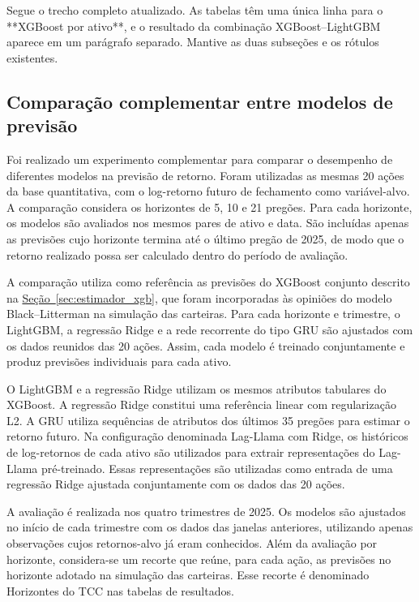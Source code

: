 Segue o trecho completo atualizado. As tabelas têm uma única linha para o **XGBoost por ativo**, e o resultado da combinação XGBoost–LightGBM aparece em um parágrafo separado. Mantive as duas subseções e os rótulos existentes.

\subsection{Comparação complementar entre modelos de previsão}
\label{sec:comparacao_modelos_previsao}

Foi realizado um experimento complementar para comparar o desempenho de diferentes modelos na previsão de retorno. Foram utilizadas as mesmas 20 ações da base quantitativa, com o log-retorno futuro de fechamento como variável-alvo. A comparação considera os horizontes de 5, 10 e 21 pregões. Para cada horizonte, os modelos são avaliados nos mesmos pares de ativo e data. São incluídas apenas as previsões cujo horizonte termina até o último pregão de 2025, de modo que o retorno realizado possa ser calculado dentro do período de avaliação.

A comparação utiliza como referência as previsões do XGBoost conjunto descrito na \hyperref[sec:estimador_xgb]{Seção~\ref*{sec:estimador_xgb}}, que foram incorporadas às opiniões do modelo Black--Litterman na simulação das carteiras. Para cada horizonte e trimestre, o LightGBM, a regressão Ridge e a rede recorrente do tipo GRU são ajustados com os dados reunidos das 20 ações. Assim, cada modelo é treinado conjuntamente e produz previsões individuais para cada ativo.

O LightGBM e a regressão Ridge utilizam os mesmos atributos tabulares do XGBoost. A regressão Ridge constitui uma referência linear com regularização L2. A GRU utiliza sequências de atributos dos últimos 35 pregões para estimar o retorno futuro. Na configuração denominada Lag-Llama com Ridge, os históricos de log-retornos de cada ativo são utilizados para extrair representações do Lag-Llama pré-treinado. Essas representações são utilizadas como entrada de uma regressão Ridge ajustada conjuntamente com os dados das 20 ações.

A avaliação é realizada nos quatro trimestres de 2025. Os modelos são ajustados no início de cada trimestre com os dados das janelas anteriores, utilizando apenas observações cujos retornos-alvo já eram conhecidos. Além da avaliação por horizonte, considera-se um recorte que reúne, para cada ação, as previsões no horizonte adotado na simulação das carteiras. Esse recorte é denominado Horizontes do TCC nas tabelas de resultados.

